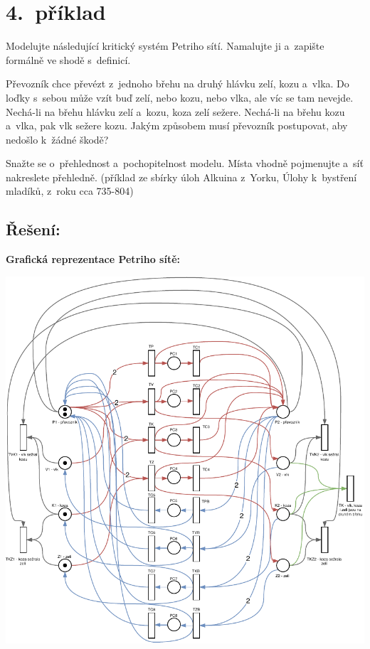 \documentclass[a4paper, 11pt, fleqn]{scrartcl}
\begin{document}
	\section*{4.~příklad}

	Modelujte následující kritický systém Petriho sítí. Namalujte ji
	a~zapište formálně ve shodě s~definicí.
	\medskip

	Převozník chce převézt z~jednoho břehu na druhý hlávku zelí, kozu
	a~vlka. Do loďky s~sebou může vzít buď zelí, nebo kozu, nebo
	vlka, ale víc se tam nevejde. Nechá-li na břehu hlávku zelí
	a~kozu, koza zelí sežere. Nechá-li na břehu kozu a~vlka, pak
	vlk sežere kozu. Jakým způsobem musí převozník postupovat, aby
	nedošlo k~žádné škodě?
	\medskip

	Snažte se o~přehlednost a~pochopitelnost modelu. Místa vhodně
	pojmenujte a~síť nakreslete přehledně. (příklad ze sbírky úloh
	Alkuina z~Yorku, Úlohy k~bystření mladíků, z~roku cca 735-804)

	\subsection*{Řešení:}

	\textbf{Grafická reprezentace Petriho sítě:}
	\begin{center}
		\includegraphics[width=.95 \linewidth]{img/pt.pdf}
	\end{center}
\end{document}
